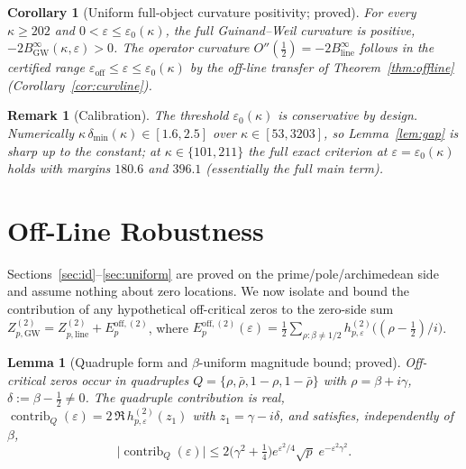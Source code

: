 \documentclass[11pt]{article}
\newtheorem{lemma}[theorem]{Lemma}
\newtheorem{corollary}[theorem]{Corollary}
\newtheorem*{remark}{Remark}
\newcommand{\BinfGW}{B_{\mathrm{GW}}^{\infty}}   %
\newcommand{\Binfline}{B_{\mathrm{line}}^{\infty}} %
\newcommand{\dmin}{\delta_{\min}}           %
\newcommand{\ZtwoGW}{Z_{p,\mathrm{GW}}^{(2)}}   %
\newcommand{\Ztwoline}{Z_{p,\mathrm{line}}^{(2)}} %
\newcommand{\Eoff}{E_p^{\mathrm{off},(2)}}  %
\begin{document}
\begin{corollary}[Uniform full-object curvature positivity; proved]
\label{cor:curvuniform}
For every $\kappa\ge 202$ and $0<\varepsilon\le\varepsilon_0(\kappa)$, the
full Guinand--Weil curvature is positive, $-2\BinfGW(\kappa,\varepsilon)>0$.
The operator curvature $O''(\tfrac12)=-2\Binfline$ follows in the certified
range $\varepsilon_{\mathrm{off}}\le\varepsilon\le\varepsilon_0(\kappa)$ by
the off-line transfer of Theorem~\ref{thm:offline}
(Corollary~\ref{cor:curvline}).
\end{corollary}

\begin{remark}[Calibration]
The threshold $\varepsilon_0(\kappa)$ is conservative by design.
Numerically $\kappa\,\dmin(\kappa)\in[1.6,2.5]$ over $\kappa\in[53,3203]$,
so Lemma~\ref{lem:gap} is sharp up to the constant; at
$\kappa\in\{101,211\}$ the full exact criterion at
$\varepsilon=\varepsilon_0(\kappa)$ holds with margins $180.6$ and $396.1$
(essentially the full main term).
\end{remark}

\section{Off-Line Robustness}
\label{sec:offline}

Sections~\ref{sec:id}--\ref{sec:uniform} are proved on the
prime/pole/archimedean side and assume nothing about zero locations.
We now isolate and bound the contribution of any hypothetical off-critical
zeros to the zero-side sum $\ZtwoGW=\Ztwoline+\Eoff$, where
$\Eoff(\varepsilon)=\tfrac12\sum_{\rho:\beta\ne 1/2}
h^{(2)}_{p,\varepsilon}\bigl((\rho-\tfrac12)/i\bigr)$.

\begin{lemma}[Quadruple form and $\beta$-uniform magnitude bound; proved]
\label{lem:mag}
Off-critical zeros occur in quadruples
$Q=\{\rho,\bar\rho,1-\rho,1-\bar\rho\}$ with $\rho=\beta+i\gamma$,
$\delta:=\beta-\tfrac12\ne 0$.
The quadruple contribution is real,
$\operatorname{contrib}_Q(\varepsilon)=2\,\Re\,h^{(2)}_{p,\varepsilon}(z_1)$
with $z_1=\gamma-i\delta$, and satisfies, independently of $\beta$,
\[
\bigl|\operatorname{contrib}_Q(\varepsilon)\bigr|
 \le 2\bigl(\gamma^2+\tfrac14\bigr)e^{\varepsilon^2/4}\sqrt p\;
   e^{-\varepsilon^2\gamma^2}.
\]
\end{lemma}
\end{document}
